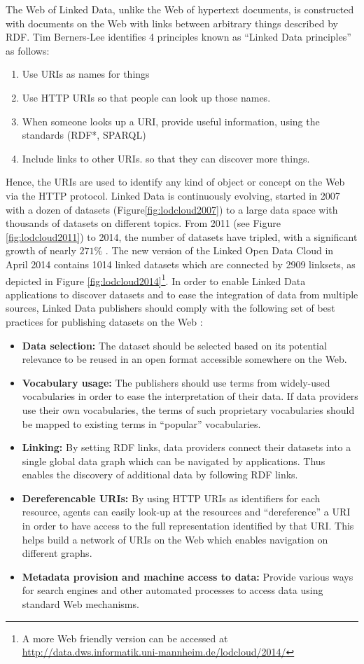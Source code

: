 The Web of Linked Data, unlike the Web of hypertext documents, is constructed with documents on the Web with links between arbitrary things described by RDF. Tim Berners-Lee \cite{timld} identifies 4 principles known as ``Linked Data principles'' as follows:
\begin{enumerate}
 \item Use URIs as names for things
 \item Use HTTP URIs so that people can look up those names.
 \item When someone looks up a URI, provide useful information, using the standards (RDF*, SPARQL)
 \item Include links to other URIs. so that they can discover more things.
\end{enumerate}
Hence, the URIs are used to identify any kind of object or concept on the Web via the HTTP protocol. Linked Data is continuously evolving, started in 2007 with a dozen of datasets (Figure\ref{fig:lodcloud2007}) to a large data space with thousands of datasets on different topics. From 2011 (see Figure \ref{fig:lodcloud2011})\cite{jentzsch2011} to 2014, the number of datasets have tripled, with a significant growth of nearly $271\%$ \cite{max2014}. The new version of the Linked Open Data Cloud in April 2014 contains 1014 linked datasets which are connected by 2909 linksets, as depicted in Figure \ref{fig:lodcloud2014}\footnote{A more Web friendly version can be accessed at \url{http://data.dws.informatik.uni-mannheim.de/lodcloud/2014/}}. In order to enable Linked Data applications to discover datasets and to ease the integration of data from multiple sources, Linked Data publishers should comply with the following set of best practices for publishing datasets on the Web \cite{Heath2011}:
\begin{itemize}
 \item \textbf{Data selection:} The dataset should be selected based on its potential relevance to be reused in an open format accessible somewhere on the Web.
 \item \textbf{Vocabulary usage:} The publishers should use terms from widely-used vocabularies in order to ease the interpretation of their data. If data providers use their own vocabularies, the terms of such proprietary vocabularies should be mapped to existing terms in ``popular'' vocabularies.
 \item \textbf{Linking:} By setting RDF links, data providers connect their datasets into a single global data graph which can be navigated by applications. Thus enables the discovery of additional data by following RDF links.
 \item \textbf{Dereferencable URIs:} By using HTTP URIs as identifiers for each resource, agents can easily look-up at the resources and ``dereference'' a URI in order to have access to the full representation identified by that URI. This helps build a network of URIs on the Web which enables navigation on different graphs.
 \item \textbf{Metadata provision and machine access to data:} Provide various ways for search engines and other automated processes to access data using standard Web mechanisms.
\end{itemize}

